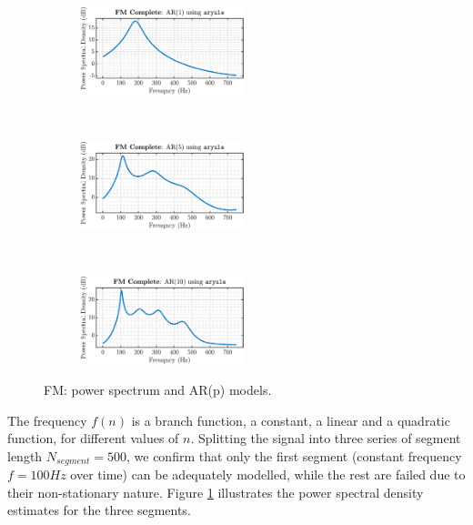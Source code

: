 \begin{enumerate}[label=\alph*), leftmargin=*]
\begin{figure}[h]
    \centering
    \begin{subfigure}{0.32\textwidth}
        \centering
        \includegraphics[height=1in]{report/widely-linear-filtering-and-adaptive-spectrum-estimation/adaptive-AR-model-based-time-frequency-estimation/assets/a/complete_aryule_1}
    \end{subfigure}
    ~
    \begin{subfigure}{0.32\textwidth}
        \centering
        \includegraphics[height=1in]{report/widely-linear-filtering-and-adaptive-spectrum-estimation/adaptive-AR-model-based-time-frequency-estimation/assets/a/complete_aryule_5}
    \end{subfigure}
    ~
    \begin{subfigure}{0.32\textwidth}
        \centering
        \includegraphics[height=1in]{report/widely-linear-filtering-and-adaptive-spectrum-estimation/adaptive-AR-model-based-time-frequency-estimation/assets/a/complete_aryule_10}
    \end{subfigure}
    \caption{FM: power spectrum and AR(p) models.}
    \label{fig:4_2_a_2}
\end{figure}

The frequency $f(n)$ is a branch function, a constant, a linear and a quadratic function, for different values of $n$. Splitting the signal into three series of segment length $N_{segment} = 500$,
we confirm that only the first segment (constant frequency $f = 100 Hz$ over time) can be adequately modelled, while the rest are failed due to their non-stationary nature.
Figure \ref{fig:4_2_a_2} illustrates the power spectral density estimates for the three segments.


\end{enumerate}
